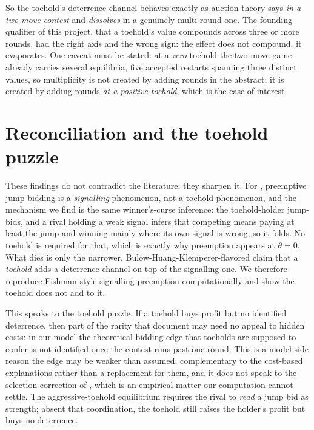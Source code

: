 \documentclass[11pt,a4paper]{article}
\newcommand{\theold}{\theta}   %
\begin{document}
So the toehold's deterrence channel behaves exactly as auction theory says \emph{in a two-move contest} and \emph{dissolves} in a genuinely multi-round one. The founding qualifier of this project, that a toehold's value compounds across three or more rounds, had the right axis and the wrong sign: the effect does not compound, it evaporates. One caveat must be stated: at a \emph{zero} toehold the two-move game already carries several equilibria, five accepted restarts spanning three distinct values, so multiplicity is not created by adding rounds in the abstract; it is created by adding rounds \emph{at a positive toehold}, which is the case of interest.

\section{Reconciliation and the toehold puzzle}
\label{sec:reconcile}

These findings do not contradict the literature; they sharpen it. For \citet{fishman1988}, preemptive jump bidding is a \emph{signalling} phenomenon, not a toehold phenomenon, and the mechanism we find is the same winner's-curse inference: the toehold-holder jump-bids, and a rival holding a weak signal infers that competing means paying at least the jump and winning mainly where its own signal is wrong, so it folds. No toehold is required for that, which is exactly why preemption appears at $\theold=0$. What dies is only the narrower, Bulow-Huang-Klemperer-flavored claim that a \emph{toehold} adds a deterrence channel on top of the signalling one. We therefore reproduce Fishman-style signalling preemption computationally and show the toehold does not add to it.

This speaks to the toehold puzzle. If a toehold buys profit but no identified deterrence, then part of the rarity that \citet{bettoneckbothorburn2009} document may need no appeal to hidden costs: in our model the theoretical bidding edge that toeholds are supposed to confer is not identified once the contest runs past one round. This is a model-side reason the edge may be weaker than assumed, complementary to the cost-based explanations rather than a replacement for them, and it does not speak to the selection correction of \citet{daigryglewiczsmit2021}, which is an empirical matter our computation cannot settle. The aggressive-toehold equilibrium requires the rival to \emph{read} a jump bid as strength; absent that coordination, the toehold still raises the holder's profit but buys no deterrence.
\end{document}

